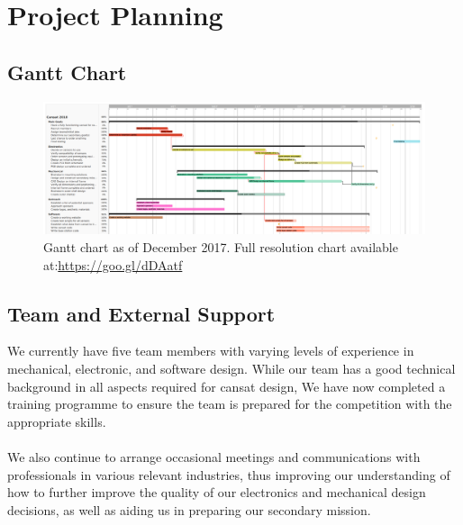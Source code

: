\documentclass{report}
\begin{document}
\chapter{Project Planning}
	\section{Gantt Chart}
	\begin{figure}[h]
		\centering
		\includegraphics[width=\textwidth]{ganttDec.PNG}
		\caption{Gantt chart as of December 2017. Full resolution chart 
		available at:\url{https://goo.gl/dDAatf}}
	\end{figure}
	
	\section{Team and External Support}
		We currently have five team members with varying levels of experience in
		mechanical, electronic, and software design. While our team has a good
		technical background in all aspects required for cansat design, {\color{blue}
		We have now completed a training programme to ensure the team is 
		prepared for the competition with the appropriate skills.}
		\\\\
		We also continue to arrange occasional meetings and communications with
		professionals in various relevant industries, thus improving our 
		understanding of how to further improve the quality of our electronics 
		and mechanical design decisions, as well as aiding us in preparing our
		secondary mission.
	\clearpage
\end{document}
